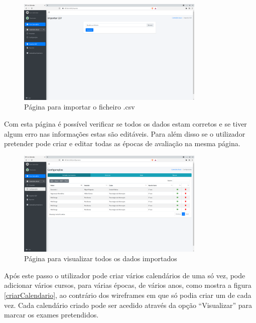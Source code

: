 \documentclass[11pt, twoside]{report}
\begin{document}
	\begin{figure}[H] 
		\centering 							\includegraphics[width=0.8\textwidth,height=0.8\textheight,keepaspectratio]{image/PrototipoAFNF/Importar}
		\caption{Página para importar o ficheiro .csv}
		\label{importarCSV}
	\end{figure}

	Com esta página é possível verificar se todos os dados estam corretos e se tiver algum erro nas informações estas são editáveis. Para além disso se o utilizador pretender pode criar e editar todas as épocas de avaliação na mesma página.  
	
	
	\begin{figure}[H] 
		\centering 							\includegraphics[width=0.8\textwidth,height=0.8\textheight,keepaspectratio]{image/PrototipoAFNF/Configuracoes}
		\caption{Página para visualizar todos os dados importados}
		\label{configuracoes}
	\end{figure}
	
	Após este passo o utilizador pode criar vários calendários de uma só vez, pode adicionar vários cursos, para várias épocas, de vários anos, como mostra a figura \ref{criarCalendario}, ao contrário dos wireframes em que só podia criar um de cada vez. Cada calendário criado pode ser acedido através da opção ``Visualizar'' para marcar os exames pretendidos. 
	
\end{document}
